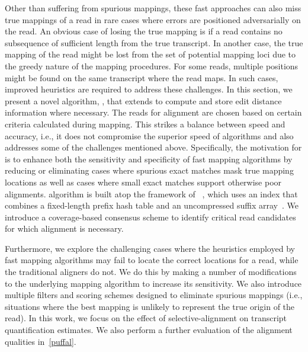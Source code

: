 Other than suffering from spurious mappings, these fast \nab approaches can also miss true 
mappings of a read in rare cases where errors are positioned adversarially on the read. 
An obvious case of losing the true mapping is if a read contains no subsequence of 
sufficient length from the true transcript. In another case, the true mapping of the 
read might be lost from the set of potential mapping loci due to the greedy nature of 
the mapping procedures. For some reads, multiple positions might be found on the same 
transcript where the read maps. In such cases, improved heuristics are required to address 
these challenges. In this section, we present a novel algorithm, \sla, that extends 
\qm to compute and store edit distance information where necessary. The reads 
for alignment are chosen based on certain criteria calculated during mapping.  This strikes 
a balance between speed and accuracy, i.e., it does not compromise the superior speed of \nab 
algorithms and also addresses some of the challenges mentioned above. Specifically, 
the motivation for \sla is to enhance both the sensitivity and specificity of fast mapping  
algorithms by reducing or eliminating cases where spurious exact matches mask true mapping 
locations as well as cases where small exact matches support otherwise poor alignments. 
\Sla algorithm is built atop the framework of \rapmap~\citep{Srivastava2016rapmap}, 
which uses an index that combines a fixed-length prefix hash table and an uncompressed 
suffix array~\citep{Manber:1993:Suffix}.  We introduce a coverage-based consensus 
scheme to identify critical read candidates for which alignment is necessary.

Furthermore, we explore the challenging cases where the heuristics employed by fast mapping 
algorithms may fail to locate the correct locations for a read, while the traditional 
aligners do not. We do this by making a number of modifications to the underlying mapping 
algorithm to increase its sensitivity.  We also introduce multiple filters and scoring 
schemes designed to eliminate spurious mappings (i.e., situations where the best mapping 
is unlikely to represent the true origin of the read). In this work, we focus on the effect 
of selective-alignment on transcript quantification estimates. 
We also perform a further evaluation of the alignment qualities in~\cref{puffal}.

